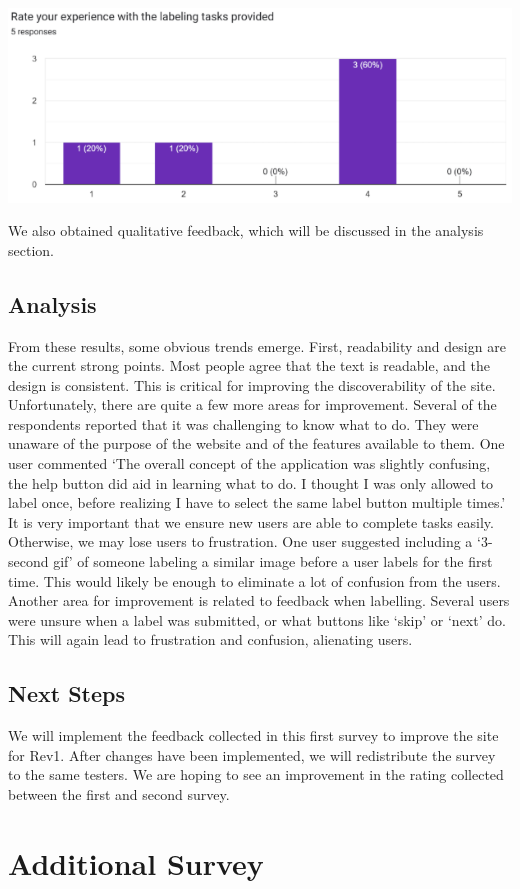 \documentclass[12pt, titlepage]{article}
\begin{document}
\begin{centering}
\includegraphics[scale=0.7]{chart (1).png}\\
\end{centering}
We also obtained qualitative feedback, which will be discussed in the analysis section.
\subsection{Analysis}
From these results, some obvious trends emerge. First, readability and design are the current strong points. Most people agree that the text is readable, and the design is consistent. This is critical for improving the discoverability of the site.
Unfortunately, there are quite a few more areas for improvement. Several of the respondents reported that it was challenging to know what to do. They were unaware of the purpose of the website and of the features available to them. One user commented `The overall concept of the application was slightly confusing, the help button did aid in learning what to do. I thought I was only allowed to label once, before realizing I have to select the same label button multiple times.'
It is very important that we ensure new users are able to complete tasks easily. Otherwise, we may lose users to frustration. One user suggested including a `3-second gif' of someone labeling a similar image before a user labels for the first time. This would likely be enough to eliminate a lot of confusion from the users. Another area for improvement is related to feedback when labelling. Several users were unsure when a label was submitted, or what buttons like `skip' or `next' do. 
This will again lead to frustration and confusion, alienating users. 

\subsection{Next Steps}
We will implement the feedback collected in this first survey to improve the site for Rev1. After changes have been implemented, we will redistribute the survey to the same testers. We are hoping to see an improvement in the rating collected between the first and second survey.
 

\section{Additional Survey}
\end{document}
